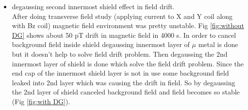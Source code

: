 \begin{itemize}
   \item degaussing second innermost shield effect in field drift.\\
   After doing transverse field study (applying current to X and Y coil along with Bz coil) magnetic field environment was pretty unstable. Fig \ref{fig:without DG} shows about 50 pT drift in magnetic field in 4000 s. In order to cancel background field inside shield degaussing innermost layer of $\mu$ metal is done but it doesn't help to solve field drift problem. Then degaussing the 2nd innermost layer of shield is done which solve the field drift problem. Since the end cap of the innermost shield layer is not in use some background field leaked into 2nd layer which was causing the drift in field. So by degaussing the 2nd layer of shield canceled background field and field becomes so stable (Fig \ref{fig:with DG}).
   
  \begin{figure}
    \centering
 

\end{figure}
\end{itemize}
